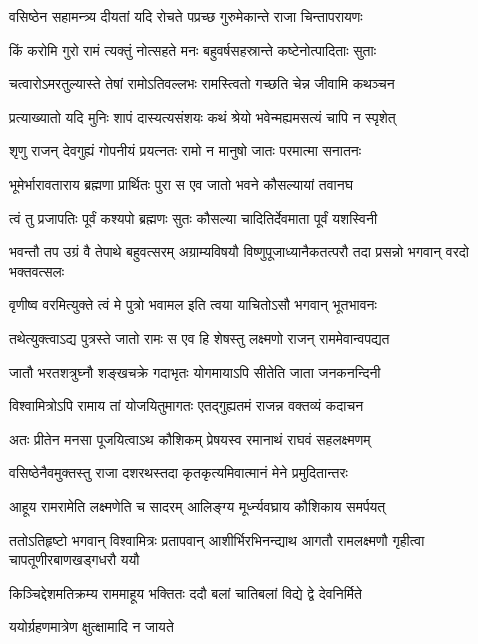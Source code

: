 \twolineshloka
{वसिष्ठेन सहामन्त्र्य दीयतां यदि रोचते}
{पप्रच्छ गुरुमेकान्ते राजा चिन्तापरायणः} %

\twolineshloka
{किं करोमि गुरो रामं त्यक्तुं नोत्सहते मनः}
{बहुवर्षसहस्रान्ते कष्टेनोत्पादिताः सुताः} %

\twolineshloka
{चत्वारोऽमरतुल्यास्ते तेषां रामोऽतिवल्लभः}
{रामस्त्वितो गच्छति चेन्न जीवामि कथञ्चन} %

\twolineshloka
{प्रत्याख्यातो यदि मुनिः शापं दास्यत्यसंशयः}
{कथं श्रेयो भवेन्मह्यमसत्यं चापि न स्पृशेत्} %


\twolineshloka
{शृणु राजन् देवगुह्यं गोपनीयं प्रयत्नतः}
{रामो न मानुषो जातः परमात्मा सनातनः} %

\twolineshloka
{भूमेर्भारावताराय ब्रह्मणा प्रार्थितः पुरा}
{स एव जातो भवने कौसल्यायां तवानघ} %

\twolineshloka
{त्वं तु प्रजापतिः पूर्वं कश्यपो ब्रह्मणः सुतः}
{कौसल्या चादितिर्देवमाता पूर्वं यशस्विनी} %

\threelineshloka
{भवन्तौ तप उग्रं वै तेपाथे बहुवत्सरम्}
{अग्राम्यविषयौ विष्णुपूजाध्यानैकतत्परौ}
{तदा प्रसन्नो भगवान् वरदो भक्तवत्सलः} %

\twolineshloka
{वृणीष्व वरमित्युक्ते त्वं मे पुत्रो भवामल}
{इति त्वया याचितोऽसौ भगवान् भूतभावनः} %

\twolineshloka
{तथेत्युक्त्वाऽद्य पुत्रस्ते जातो रामः स एव हि}
{शेषस्तु लक्ष्मणो राजन् राममेवान्वपद्यत} %

\twolineshloka
{जातौ भरतशत्रुघ्नौ शङ्खचक्रे गदाभृतः}
{योगमायाऽपि सीतेति जाता जनकनन्दिनी} %

\twolineshloka
{विश्वामित्रोऽपि रामाय तां योजयितुमागतः}
{एतद्गुह्यतमं राजन्न वक्तव्यं कदाचन} %

\twolineshloka
{अतः प्रीतेन मनसा पूजयित्वाऽथ कौशिकम्}
{प्रेषयस्व रमानाथं राघवं सहलक्ष्मणम्} %

\twolineshloka
{वसिष्ठेनैवमुक्तस्तु राजा दशरथस्तदा}
{कृतकृत्यमिवात्मानं मेने प्रमुदितान्तरः} %

\twolineshloka
{आहूय रामरामेति लक्ष्मणेति च सादरम्}
{आलिङ्ग्य मूर्ध्न्यवघ्राय कौशिकाय समर्पयत्} %

\threelineshloka
{ततोऽतिहृष्टो भगवान् विश्वामित्रः प्रतापवान्}
{आशीर्भिरभिनन्द्याथ आगतौ रामलक्ष्मणौ}
{गृहीत्वा चापतूणीरबाणखड्गधरौ ययौ} %

\twolineshloka
{किञ्चिद्देशमतिक्रम्य राममाहूय भक्तितः}
{ददौ बलां चातिबलां विद्ये द्वे देवनिर्मिते} %

\onelineshloka
{ययोर्ग्रहणमात्रेण क्षुत्क्षामादि न जायते} %

